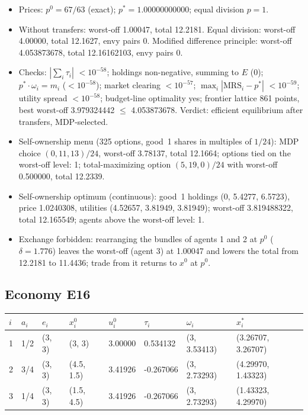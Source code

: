 \begin{itemize}[leftmargin=1.2em,itemsep=0pt,topsep=2pt]\footnotesize
\item Prices: $p^0 = 67/63$ (exact); $p^* = 1.00000000000$; equal division $p = 1$.
\item Without transfers: worst-off 1.00047, total 12.2181. Equal division: worst-off 4.00000, total 12.1627, envy pairs 0. Modified difference principle: worst-off 4.053873678, total 12.16162103, envy pairs 0.
\item Checks: $|\sum_i\tau_i|$ $<10^{-58}$; holdings non-negative, summing to $E$ (0); $p^*\cdot\omega_i = m_i$ ($<10^{-58}$); market clearing $<10^{-57}$; $\max_i|\mathrm{MRS}_i - p^*|$ $<10^{-59}$; utility spread $<10^{-58}$; budget-line optimality yes; frontier lattice 861 points, best worst-off 3.979324442 $\leq$ 4.053873678. Verdict: efficient equilibrium after transfers, MDP-selected.
\item Self-ownership menu (325 options, good~1 shares in multiples of $1/24$): MDP choice $(0, 11, 13)/24$, worst-off 3.78137, total 12.1664; options tied on the worst-off level: 1; total-maximizing option $(5, 19, 0)/24$ with worst-off 0.500000, total 12.2339.
\item Self-ownership optimum (continuous): good~1 holdings (0, 5.4277, 6.5723), price 1.0240308, utilities (4.52657, 3.81949, 3.81949); worst-off 3.819488322, total 12.165549; agents above the worst-off level: 1.
\item Exchange forbidden: rearranging the bundles of agents 1 and 2 at $p^0$ ($\delta = 1.776$) leaves the worst-off (agent 3) at 1.00047 and lowers the total from 12.2181 to 11.4436; trade from it returns to $x^0$ at $p^0$.
\end{itemize}

\subsection*{Economy E16}
\label{ec:E16}
{\scriptsize\setlength{\tabcolsep}{3pt}
\begin{tabular}{@{}llllllll@{}}
\toprule
$i$ & $a_i$ & $e_i$ & $x^0_i$ & $u^0_i$ & $\tau_i$ & $\omega_i$ & $x^*_i$ \\
\midrule
1 & 1/2 & (3, 3) & (3, 3) & 3.00000 & 0.534132 & (3, 3.53413) & (3.26707, 3.26707) \\
2 & 3/4 & (3, 3) & (4.5, 1.5) & 3.41926 & -0.267066 & (3, 2.73293) & (4.29970, 1.43323) \\
3 & 1/4 & (3, 3) & (1.5, 4.5) & 3.41926 & -0.267066 & (3, 2.73293) & (1.43323, 4.29970) \\
\bottomrule\end{tabular}}

